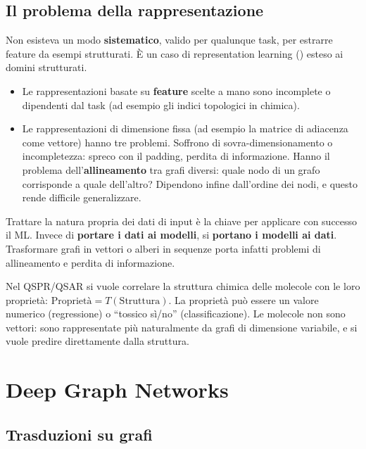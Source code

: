 \subsection{Il problema della rappresentazione}

Non esisteva un modo \textbf{sistematico}, valido per qualunque task, per estrarre feature da esempi strutturati. È
un caso di representation learning () esteso ai domini strutturati.
\begin{itemize}
  \item Le rappresentazioni basate su \textbf{feature} scelte a mano sono incomplete o dipendenti dal task (ad esempio
        gli indici topologici in chimica).
  \item Le rappresentazioni di dimensione fissa (ad esempio la matrice di adiacenza come vettore) hanno tre
        problemi. Soffrono di sovra-dimensionamento o incompletezza: spreco con il padding, perdita di
        informazione. Hanno il problema dell'\textbf{allineamento} tra grafi diversi: quale nodo di un grafo
        corrisponde a quale dell'altro? Dipendono infine dall'ordine dei nodi, e questo rende difficile
        generalizzare.
\end{itemize}

\begin{idea}
Trattare la natura propria dei dati di input è la chiave per applicare con successo il ML. Invece di \textbf{portare
i dati ai modelli}, si \textbf{portano i modelli ai dati}. Trasformare grafi in vettori o alberi in sequenze porta
infatti problemi di allineamento e perdita di informazione.
\end{idea}

\begin{esempio}[Molecole]
Nel QSPR/QSAR si vuole correlare la struttura chimica delle molecole con le loro proprietà:
$\text{Proprietà} = T(\text{Struttura})$. La proprietà può essere un valore numerico (regressione) o ``tossico
sì/no'' (classificazione). Le molecole non sono vettori: sono rappresentate più naturalmente da grafi di
dimensione variabile, e si vuole predire direttamente dalla struttura.
\end{esempio}

\section{Deep Graph Networks}

\subsection{Trasduzioni su grafi}

